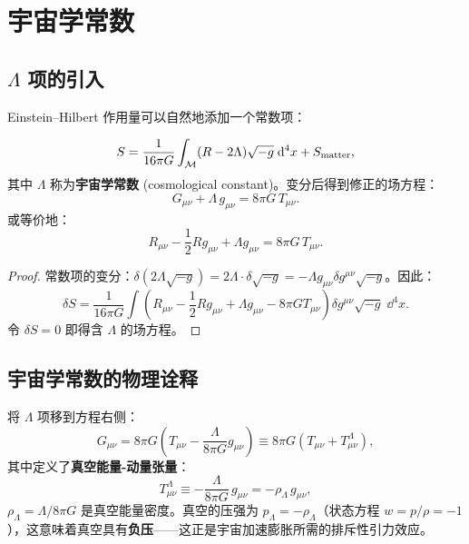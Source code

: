 \section{宇宙学常数}
\label{sec:cosmological_constant}

\subsection{$\Lambda$ 项的引入}

Einstein--Hilbert 作用量可以自然地添加一个常数项：

\begin{definition}
\begin{equation}
    S = \frac{1}{16\pi G} \int_{\mathcal{M}} (R - 2\Lambda) \sqrt{-g} \; \dd^4 x + S_{\text{matter}},
    \label{eq:EH_Lambda}
\end{equation}
其中 $\Lambda$ 称为\textbf{宇宙学常数} (cosmological constant)。变分后得到修正的场方程：
\begin{equation}
    \boxed{G_{\mu\nu} + \Lambda \, g_{\mu\nu} = 8\pi G \, T_{\mu\nu}}.
    \label{eq:EFE_Lambda}
\end{equation}
或等价地：
\begin{equation}
    R_{\mu\nu} - \frac{1}{2}R g_{\mu\nu} + \Lambda g_{\mu\nu} = 8\pi G \, T_{\mu\nu}.
\end{equation}
\end{definition}

\begin{proof}
常数项的变分：$\delta(2\Lambda\sqrt{-g}) = 2\Lambda \cdot \delta\sqrt{-g} = -\Lambda g_{\mu\nu}\delta g^{\mu\nu} \sqrt{-g}$。因此：
\begin{equation}
    \delta S = \frac{1}{16\pi G} \int \left( R_{\mu\nu} - \frac{1}{2}R g_{\mu\nu} + \Lambda g_{\mu\nu} - 8\pi G T_{\mu\nu} \right) \delta g^{\mu\nu} \sqrt{-g} \; \dd^4 x.
\end{equation}
令 $\delta S = 0$ 即得含 $\Lambda$ 的场方程。
\end{proof}

\subsection{宇宙学常数的物理诠释}

\begin{note}
将 $\Lambda$ 项移到方程右侧：
\begin{equation}
    G_{\mu\nu} = 8\pi G\left(T_{\mu\nu} - \frac{\Lambda}{8\pi G}g_{\mu\nu}\right)
    \equiv 8\pi G\left(T_{\mu\nu} + T^{\Lambda}_{\mu\nu}\right),
\end{equation}
其中定义了\textbf{真空能量-动量张量}：
\begin{equation}
    T^{\Lambda}_{\mu\nu} \equiv -\frac{\Lambda}{8\pi G} \, g_{\mu\nu} = -\rho_{\Lambda} \, g_{\mu\nu},
\end{equation}
$\rho_{\Lambda} = \Lambda/8\pi G$ 是真空能量密度。真空的压强为 $p_{\Lambda} = -\rho_{\Lambda}$（状态方程 $w = p/\rho = -1$），这意味着真空具有\textbf{负压}——这正是宇宙加速膨胀所需的排斥性引力效应。
\end{note}


